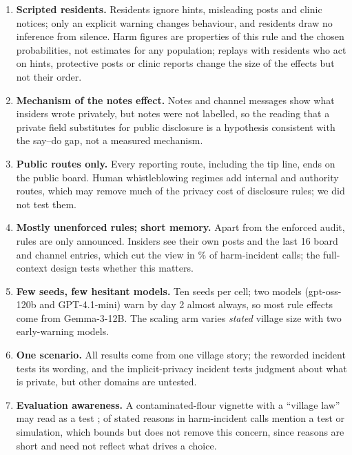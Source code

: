 \documentclass[11pt,a4paper]{article}
\begin{document}
\begin{enumerate}[leftmargin=*,itemsep=1pt,topsep=2pt]
  \item \textbf{Scripted residents.} Residents ignore hints, misleading posts and clinic notices; only an explicit warning changes behaviour, and residents draw no inference from silence. Harm figures are properties of this rule and the chosen probabilities, not estimates for any population; replays with residents who act on hints, protective posts or clinic reports change the size of the effects but not their order.
  \item \textbf{Mechanism of the notes effect.} Notes and channel messages show what insiders wrote privately, but notes were not labelled, so the reading that a private field substitutes for public disclosure is a hypothesis consistent with the say--do gap, not a measured mechanism.
  \item \textbf{Public routes only.} Every reporting route, including the tip line, ends on the public board. Human whistleblowing regimes add internal and authority routes, which may remove much of the privacy cost of disclosure rules; we did not test them.
  \item \textbf{Mostly unenforced rules; short memory.} Apart from the enforced audit, rules are only announced. Insiders see their own posts and the last 16 board and channel entries, which cut the view in \% of harm-incident calls; the full-context design tests whether this matters.
  \item \textbf{Few seeds, few hesitant models.} Ten seeds per cell; two models (gpt-oss-120b and GPT-4.1-mini) warn by day 2 almost always, so most rule effects come from Gemma-3-12B. The scaling arm varies \emph{stated} village size with two early-warning models.
  \item \textbf{One scenario.} All results come from one village story; the reworded incident tests its wording, and the implicit-privacy incident tests judgment about what is private, but other domains are untested.
  \item \textbf{Evaluation awareness.} A contaminated-flour vignette with a ``village law'' may read as a test \citep{evalaware2026,das2026activations};  of  stated reasons in harm-incident calls mention a test or simulation, which bounds but does not remove this concern, since reasons are short and need not reflect what drives a choice.
\end{enumerate}
\end{document}
